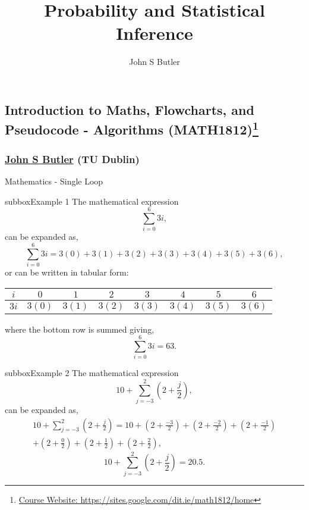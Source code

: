 \documentclass[10pt,a4paper]{article}
\title{Probability and Statistical Inference}
\author{John S Butler}
\begin{document}
\small
\begin{multicols}{3}

\scriptsize


\section*{Introduction to Maths, Flowcharts, and Pseudocode - Algorithms  (MATH1812)\footnote{\href{https://sites.google.com/dit.ie/math1812/home}{Course Website: https://sites.google.com/dit.ie/math1812/home}}}
\subsubsection*{\href{johnsbutler.netlify.com}{John S Butler} (TU Dublin) }
\begin{textbox}{Mathematics - Single Loop}

\begin{subbox}{subbox}{Example 1}
The mathematical expression
\[ \sum_{i=0}^{6} 3i, \]
can be expanded as,
\[ \sum_{i=0}^{6} 3i=3(0)+3(1)+3(2)+3(3)+3(4)+3(5)+3(6), \]
or can be written in tabular form:\\
\begin{tabular}{ c| c c c c c c c}
 $i$&$0$ & $1$ & $2$&$3$ & $4$ & $5$ & $6$\\ \hline
 $3i$&$3(0)$ & $3(1)$ & $3(2)$&$3(3)$ & $3(4)$ & $3(5)$ & $3(6)$
\end{tabular}
where the bottom row is summed giving,
\[ \sum_{i=0}^{6} 3i=63.\]
\end{subbox}

\begin{subbox}{subbox}{Example 2}
The mathematical expression
\[ 10+\sum_{j=-3}^{2} (2+\frac{j}{2}), \]
can be expanded as,
\begin{multline*}
10+\sum_{j=-3}^{2} (2+\frac{j}{2})=10+(2+\frac{-3}{2})+(2+\frac{-2}{2})+(2+\frac{-1}{2})\\+(2+\frac{0}{2})+(2+\frac{1}{2})+(2+\frac{2}{2}),
\end{multline*}
\[ 10+\sum_{j=-3}^{2} (2+\frac{j}{2})=20.5.\]
\end{subbox}


\end{textbox}
\end{multicols}
\end{document}
